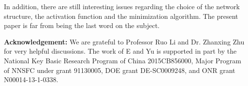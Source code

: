 \documentclass[a4paper,12pt]{article}
\begin{document}
In addition, there are still interesting issues regarding the choice of
the network structure, the activation function and the minimization algorithm.
The present paper is far from being the last word on the subject. 

{\bf Acknowledgement:}
We are grateful to Professor Ruo Li and Dr.
Zhanxing Zhu for very helpful discussions.
The work of E and Yu is supported in part by 
the National Key Basic Research Program of China 2015CB856000, Major 
Program of NNSFC under grant 91130005,
DOE grant DE-SC0009248, and ONR grant N00014-13-1-0338.


\end{document}
